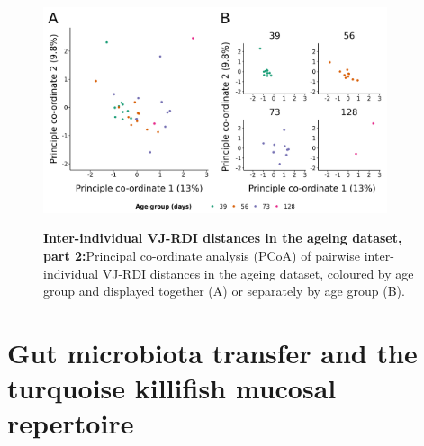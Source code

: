 \begin{figure}
\centering
\includegraphics[width = 0.9\textwidth]{_Figures/png/ageing-rdi-VJ-individual-pcoa}
\begin{subfigure}{0em}
\label{fig:igseq-ageing-rdi-VJ-individual-pcoa-all}
\end{subfigure}
\begin{subfigure}{0em}
\label{fig:igseq-ageing-rdi-VJ-individual-pcoa-facet}
\end{subfigure}
\caption[Inter-individual VJ-RDI distances in the \igseq ageing dataset, part 2]{\textbf{Inter-individual VJ-RDI distances in the \igseq ageing dataset, part 2:}Principal co-ordinate analysis (PCoA) of pairwise inter-individual VJ-RDI distances in the \igseq ageing dataset, coloured by age group and displayed together (A) or separately by age group (B).}
\label{fig:igseq-ageing-rdi-VJ-individual-pcoa}
\end{figure}

\FloatBarrier
\clearpage


\section{Gut microbiota transfer and the turquoise killifish mucosal repertoire}
\label{sec:igseq_gut}


